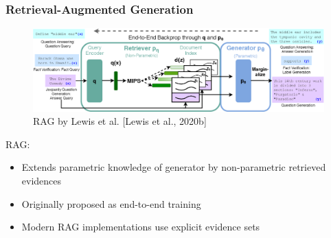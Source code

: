 \documentclass{beamer}
\begin{document}
\begin{frame}
  \frametitle{Retrieval-Augmented Generation}

  \begin{figure}
    \includegraphics[width=\textwidth]{Grafiken/RAG-Figure1.png}
    \caption{RAG by Lewis et al. [Lewis et al., 2020b]}
  \end{figure}

  RAG:
  \begin{itemize}
    \item Extends parametric knowledge of generator by non-parametric retrieved evidences
    \item Originally proposed as end-to-end training
    \item Modern RAG implementations use explicit evidence sets
  \end{itemize}
  
\end{frame}
\end{document}
